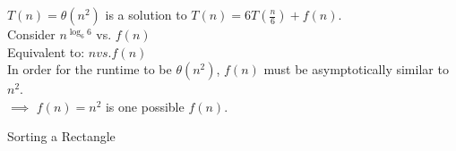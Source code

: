 \documentclass[12pt,twoside]{article}
\begin{document}
\begin{problems}
\begin{problemparts}
\bigskip $T(n) = \theta(n^{2})$ is a solution to $T(n) = 6T(\frac{n}{6}) + f(n)$. \\


\problempart Consider $n^{\log_6 6}$ vs. $f(n) $ \\
Equivalent to:  $n vs. f(n)$ \\
In order for the runtime to be $\theta(n^2)$, $f(n)$ must be asymptotically similar to $n^2$. \\
$\implies$ $f(n)=n^2$ is one possible $f(n)$.

\end{problemparts}

\problem  %

\begin{problemparts}


\problempart Sorting a Rectangle



\end{problemparts}
\end{problems}
\end{document}
